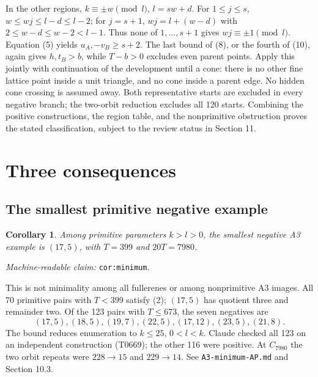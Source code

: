 \documentclass[11pt]{amsart}
\newcommand{\record}[1]{\nolinkurl{#1}}
\newtheorem{corollary}[theorem]{Corollary}
\newcommand{\claimid}[1]{\par\nopagebreak\noindent\textit{Machine-readable claim:} \record{#1}.\par}
\begin{document}
In the other regions, $k\equiv\pm w\pmod l$, $l=sw+d$.
For $1\le j\le s$, $w\le wj\le l-d\le l-2$; for $j=s+1$,
$wj=l+(w-d)$ with $2\le w-d\le w-2<l-1$. Thus none of
$1,\ldots,s+1$ gives $wj\equiv\pm1\pmod l$. Equation (5) yields
$u_A,-v_B\ge s+2$. The last bound of (8), or the fourth of (10),
again gives $h,t_B>b$, while $T-b>0$ excludes even parent points.
Apply this jointly with continuation of the development until a cone:
there is no other fine lattice point inside a unit triangle, and no
cone inside a parent edge. No hidden cone crossing is assumed away.
Both representative starts are excluded in every negative branch;
the two-orbit reduction excludes all 120 starts. Combining the positive
constructions, the region table, and the nonprimitive obstruction
proves the stated classification, subject to the review status in
Section 11.

\section{Three consequences}\label{sec:corollaries}
\subsection{The smallest primitive negative example}
\begin{corollary}\label{cor:minimum}
Among primitive parameters $k>l>0$, the smallest negative A3 example
is $(17,5)$, with $T=399$ and $20T=7980$.
\end{corollary}
\claimid{cor:minimum}
This is not minimality among all fullerenes or among nonprimitive A3
images. All 70 primitive pairs with $T<399$ satisfy (2); $(17,5)$
has quotient three and remainder two. Of the 123 pairs with $T\le673$,
the seven negatives are
\[
(17,5),(18,5),(19,7),(22,5),(17,12),(23,5),(21,8).
\]
The bound reduces enumeration to $k\le25$, $0<l<k$. Claude checked
all 123 on an independent construction (T0669); the other 116 were
positive. At $C_{7980}$ the two orbit repeats were $228\to15$ and
$229\to14$. See \record{A3-minimum-AP.md} and Section 10.3.
\end{document}
